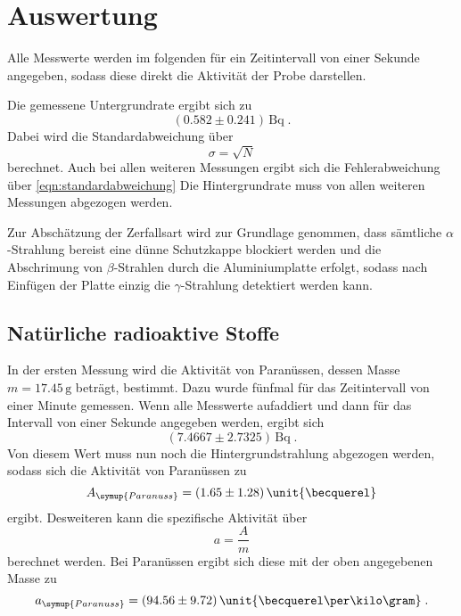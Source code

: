 \section{Auswertung}
\label{sec:Auswertung}

%
Alle Messwerte werden im folgenden für ein Zeitintervall von einer Sekunde angegeben, sodass diese direkt die Aktivität der Probe darstellen.

Die gemessene Untergrundrate ergibt sich zu
\begin{equation*}
    (0.582 \pm 0.241) \,\unit{\becquerel} \; .
\end{equation*}
Dabei wird die Standardabweichung über 
\begin{equation}
    \sigma = \sqrt{N}
    \label{eqn:standardabweichung}
\end{equation}
berechnet. Auch bei allen weiteren Messungen ergibt sich die Fehlerabweichung über \autoref{eqn:standardabweichung}
Die Hintergrundrate muss von allen weiteren Messungen abgezogen werden.

Zur Abschätzung der Zerfallsart wird zur Grundlage genommen, dass sämtliche $\alpha$-Strahlung bereist eine dünne Schutzkappe blockiert werden und die Abschrimung von $\beta$-Strahlen durch
die Aluminiumplatte erfolgt, sodass nach Einfügen der Platte einzig die $\gamma$-Strahlung detektiert werden kann.

\subsection{Natürliche radioaktive Stoffe}
\label{sec:stoffe}
In der ersten Messung wird die Aktivität von Paranüssen, dessen Masse $m = 17.45 \, \unit{\gram}$ beträgt, bestimmt. Dazu wurde fünfmal für das Zeitintervall 
von einer Minute gemessen. Wenn alle Messwerte aufaddiert und dann für das Intervall von einer Sekunde angegeben werden, ergibt sich 
\begin{equation*}
    (7.4667 \pm 2.7325) \, \unit{\becquerel} \; .
\end{equation*}
Von diesem  Wert muss nun noch die Hintergrundstrahlung abgezogen werden, sodass sich die Aktivität von Paranüssen zu 
\begin{equation*}
    A_{\symup{Paranuss}} = (1.65 \pm 1.28) \, \unit{\becquerel} 
\end{equation*}
ergibt. Desweiteren kann die spezifische Aktivität über
\begin{equation}
    a = \frac{A}{m}
    \label{eqn:spezAkt}
\end{equation}
berechnet werden. Bei Paranüssen ergibt sich diese mit der oben angegebenen Masse zu 
\begin{equation*}
    a_{{\symup{Paranuss}}} = (94.56 \pm 9.72) \, \unit{\becquerel \per \kilo\gram} \; .
\end{equation*}

